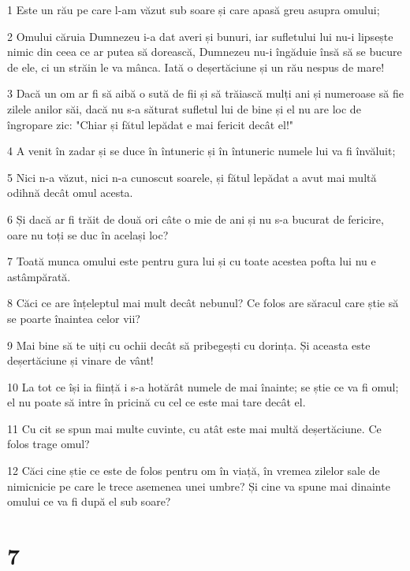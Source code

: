 \par 1 Este un rău pe care l-am văzut sub soare și care apasă greu asupra omului;
\par 2 Omului căruia Dumnezeu i-a dat averi și bunuri, iar sufletului lui nu-i lipsește nimic din ceea ce ar putea să dorească, Dumnezeu nu-i îngăduie însă să se bucure de ele, ci un străin le va mânca. Iată o deșertăciune și un rău nespus de mare!
\par 3 Dacă un om ar fi să aibă o sută de fii și să trăiască mulți ani și numeroase să fie zilele anilor săi, dacă nu s-a săturat sufletul lui de bine și el nu are loc de îngropare zic: "Chiar și fătul lepădat e mai fericit decât el!"
\par 4 A venit în zadar și se duce în întuneric și în întuneric numele lui va fi învăluit;
\par 5 Nici n-a văzut, nici n-a cunoscut soarele, și fătul lepădat a avut mai multă odihnă decât omul acesta.
\par 6 Și dacă ar fi trăit de două ori câte o mie de ani și nu s-a bucurat de fericire, oare nu toți se duc în același loc?
\par 7 Toată munca omului este pentru gura lui și cu toate acestea pofta lui nu e astâmpărată.
\par 8 Căci ce are înțeleptul mai mult decât nebunul? Ce folos are săracul care știe să se poarte înaintea celor vii?
\par 9 Mai bine să te uiți cu ochii decât să pribegești cu dorința. Și aceasta este deșertăciune și vinare de vânt!
\par 10 La tot ce își ia ființă i s-a hotărât numele de mai înainte; se știe ce va fi omul; el nu poate să intre în pricină cu cel ce este mai tare decât el.
\par 11 Cu cit se spun mai multe cuvinte, cu atât este mai multă deșertăciune. Ce folos trage omul?
\par 12 Căci cine știe ce este de folos pentru om în viață, în vremea zilelor sale de nimicnicie pe care le trece asemenea unei umbre? Și cine va spune mai dinainte omului ce va fi după el sub soare?

\chapter{7}

